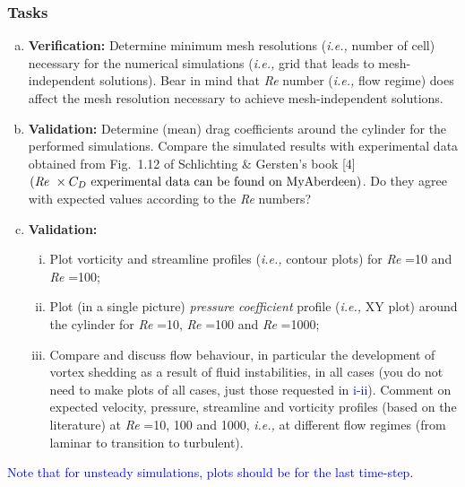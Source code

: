 \documentclass[12pts,a4paper,amsmath,amssymb,floatfix]{article}%
\newcommand{\blue}{\textcolor{blue}}
\newcommand{\ie}{{\it i.e., }}
\newcommand\Rey{\mbox{\textit{Re}}\,\,}
\begin{document}
     \begin{shaded}
       \subsubsection{Tasks}\label{FPC:Tasks}
        \begin{enumerate}[a)]
           \item {\bf Verification:} Determine minimum mesh resolutions (\ie number of cell) necessary for the numerical simulations (\ie grid that leads to mesh-independent solutions). Bear in mind that \Rey number (\ie flow regime) does affect the mesh resolution necessary to achieve mesh-independent solutions.
           \item {\bf Validation:} Determine (mean) drag coefficients around the cylinder for the performed simulations. Compare the simulated results with experimental data obtained from Fig.~1.12 of Schlichting \& Gersten's book [4] $\left(\text{\Rey}\times C_{D} \text{ experimental data can be found on MyAberdeen}\right)$. Do they agree with expected values according to the \Rey numbers?
           \item {\bf Validation:}
             \begin{enumerate}[i)]
               \item\label{Task:Plot} Plot vorticity and streamline profiles (\ie contour plots) for \Rey=10 and \Rey=100;
               \item Plot (in a single picture) {\it pressure coefficient} profile (\ie XY plot) around the cylinder for \Rey=10, \Rey=100 and \Rey=1000;
               \item Compare and discuss flow behaviour, in particular the development of vortex shedding as a result of fluid instabilities, in all cases (you do not need to make plots of all cases, just those requested in \blue{i-ii}). Comment on expected velocity, pressure, streamline and vorticity profiles (based on the literature) at \Rey=10, 100 and 1000, \ie at different flow regimes (from laminar to transition to turbulent).
               \end{enumerate}
        \end{enumerate}
        \begin{center}\blue{Note that for unsteady simulations, plots should be for the last time-step.}\end{center}
     \end{shaded}
\end{document}
